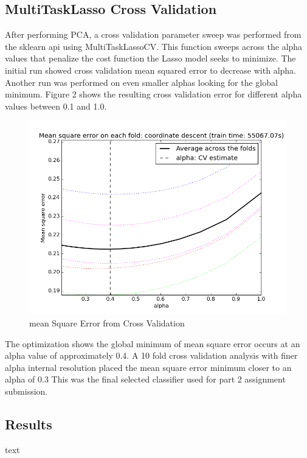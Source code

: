 \documentclass{article} %
\begin{document}
\subsection{MultiTaskLasso Cross Validation}
After performing PCA, a cross validation parameter sweep was performed from the sklearn api using MultiTaskLassoCV. This function sweeps across the alpha values that penalize the cost function the Lasso model seeks to minimize. The initial run showed cross validation mean squared error to decrease with alpha. Another run was performed on even smaller alphas looking for the global minimum. Figure 2 shows the resulting cross validation error for different alpha values between 0.1 and 1.0. 

\begin{figure}[h]
	\begin{center}
		\includegraphics[scale=.4]{media/cross_validation_figure_2.png}
	\end{center}
	\caption{mean Square Error from Cross Validation}
\end{figure}

The optimization shows the global minimum of mean square error occurs at an alpha value of approximately 0.4. A 10 fold cross validation analysis with finer alpha internal resolution placed the mean square error minimum closer to an alpha of 0.3 This was the final selected classifier used for part 2 assignment submission.


\subsection{Results}
text
\end{document}
